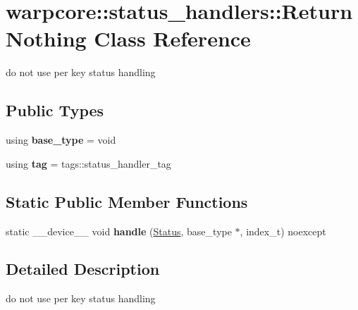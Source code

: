 \hypertarget{classwarpcore_1_1status__handlers_1_1ReturnNothing}{}\section{warpcore\+:\+:status\+\_\+handlers\+:\+:Return\+Nothing Class Reference}
\label{classwarpcore_1_1status__handlers_1_1ReturnNothing}


do not use per key status handling  


\subsection*{Public Types}
\begin{DoxyCompactItemize}
\item 
\mbox{\label{classwarpcore_1_1status__handlers_1_1ReturnNothing_a65d2b010981c319e7dbd6afe4972ffe3}} 
using {\bfseries base\+\_\+type} = void
\item 
\mbox{\label{classwarpcore_1_1status__handlers_1_1ReturnNothing_a21556912886886dbb1b07cfc22018815}} 
using {\bfseries tag} = tags\+::status\+\_\+handler\+\_\+tag
\end{DoxyCompactItemize}
\subsection*{Static Public Member Functions}
\begin{DoxyCompactItemize}
\item 
\mbox{\label{classwarpcore_1_1status__handlers_1_1ReturnNothing_ac7915e26369a35dd460ebff0424475b8}} 
static \+\_\+\+\_\+device\+\_\+\+\_\+ void {\bfseries handle} (\hyperlink{classwarpcore_1_1Status}{Status}, base\+\_\+type $\ast$, index\+\_\+t) noexcept
\end{DoxyCompactItemize}


\subsection{Detailed Description}
do not use per key status handling 